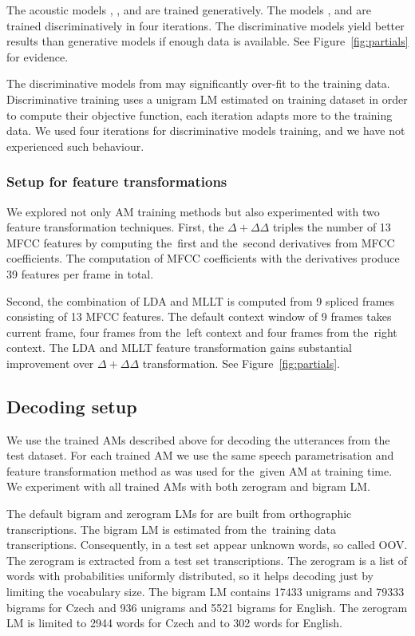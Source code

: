 The acoustic models , ,  and  are trained generatively.
The models ,  and  are trained discriminatively in four iterations.
The discriminative models yield better results than generative models if enough data is available. 
See Figure~\ref{fig:partials} for evidence.

The discriminative models from may significantly over-fit to the training data.
Discriminative training uses a unigram \ac{LM} estimated on training dataset in order to compute their objective function, each iteration adapts more to the training data.
We used four iterations for discriminative models training, and we have not experienced such behaviour.

\subsubsection*{Setup for feature transformations}
We explored not only \ac{AM} training methods but also experimented with two feature transformation techniques.
First, the $\Delta + \Delta\Delta$ triples the number of 13 \ac{MFCC} features by computing the~first and the~second derivatives from \ac{MFCC} coefficients. 
The computation of \ac{MFCC} coefficients with the derivatives produce 39 features per frame in total.

Second, the combination of \ac{LDA} and \ac{MLLT} is computed from 9 spliced frames consisting of 13 \ac{MFCC} features. 
The default context window of 9 frames takes current frame, four frames from the~left context and four frames from the~right context.
The \ac{LDA} and \ac{MLLT} feature transformation gains substantial improvement over $\Delta+\Delta\Delta$ transformation.
See Figure~\ref{fig:partials}.

\subsection*{Decoding setup}
We use the trained \acp{AM} described above for decoding the utterances from the test dataset.
For each trained \ac{AM} we use the same speech parametrisation and feature transformation method as was used for the~given \ac{AM} at training time.
We experiment with all trained \acp{AM} with both zerogram and bigram \ac{LM}.

The default bigram and zerogram \acp{LM} for are built from orthographic transcriptions.
The bigram \ac{LM} is estimated from the~training data transcriptions. 
Consequently, in a test set appear unknown words, so called \acl{OOV}.
The zerogram is extracted from a test set transcriptions.
The zerogram is a list of words with probabilities uniformly distributed, so it helps decoding just by limiting the vocabulary size.
The bigram \ac{LM} contains 17433 unigrams and 79333 bigrams for Czech and 936 unigrams and 5521 bigrams for English. 
The zerogram \ac{LM} is limited to 2944 words for Czech and to 302 words for English.

